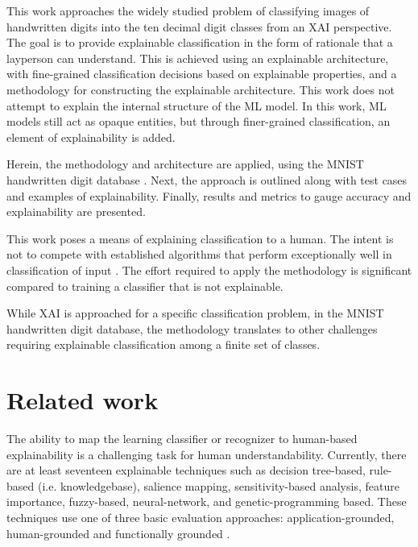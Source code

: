 \documentclass[conference]{IEEEtran}
\begin{document}


This work approaches the widely studied problem of classifying images of handwritten digits into the ten decimal digit classes from an XAI perspective.  The goal is to provide explainable classification in the form of rationale that a layperson can understand.  This is achieved using an explainable architecture, with fine-grained classification decisions based on explainable properties, and a methodology for constructing the explainable architecture.  This work does not attempt to explain the internal structure of the ML model.  In this work, ML models still act as opaque entities, but through finer-grained classification, an element of explainability is added.

Herein, the methodology and architecture are applied, using the MNIST handwritten digit database \cite{deng2012mnist}.  Next, the approach is outlined along with test cases and examples of explainability.  Finally, results and metrics to gauge accuracy and explainability are presented.

This work poses a means of explaining classification to a human.  The intent is not to compete with established algorithms that perform exceptionally well in classification of input \cite{keysers07} \cite{lecun98} \cite{schm2012}.  The effort required to apply the methodology is significant compared to training a classifier that is not explainable.

While XAI is approached for a specific classification problem, in the MNIST handwritten digit database, the methodology translates to other challenges requiring explainable classification among a finite set of classes.

\section{Related work}

The ability to map the learning classifier or recognizer to human-based explainability is a challenging task for human understandability.  Currently, there are at least seventeen explainable techniques such as
decision tree-based, rule-based (i.e. knowledgebase), salience mapping,
sensitivity-based analysis, feature importance, fuzzy-based, neural-network, and genetic-programming based.  These techniques use one of three basic evaluation approaches: application-grounded, human-grounded and functionally grounded \cite{Arrieta2020ExplainableAI,Survey18,Fuzzy19,Hagras18,GP18}.
\end{document}
